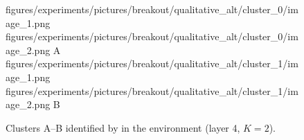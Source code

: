 \begin{figure}[H]
    \qualitativeClusterFigureSetup
    \qualitativeClusterTwo
        {figures/experiments/pictures/breakout/qualitative_alt/cluster_0/image_1.png}
        {figures/experiments/pictures/breakout/qualitative_alt/cluster_0/image_2.png}
        {A}
    \qualitativeClusterTwo
        {figures/experiments/pictures/breakout/qualitative_alt/cluster_1/image_1.png}
        {figures/experiments/pictures/breakout/qualitative_alt/cluster_1/image_2.png}
        {B}
    \caption{Clusters A--B identified by  in the \BreakoutName environment (layer 4, $K=2$).}
    \label{fig:qualitative_breakout_alt}
\end{figure}
